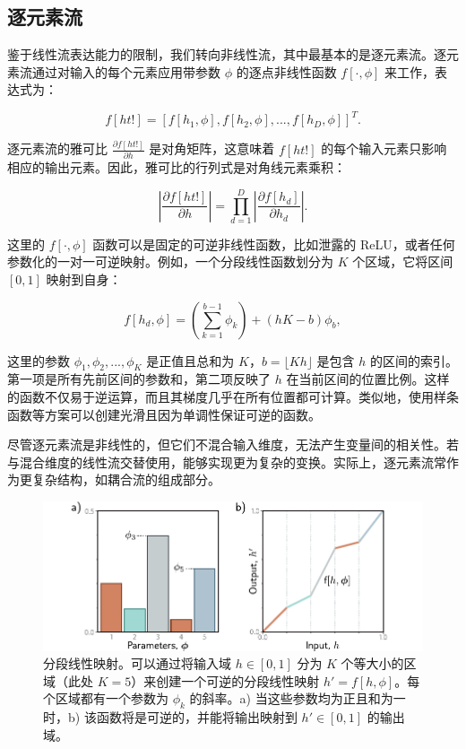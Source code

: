 \documentclass[lang=cn,newtx,10pt,scheme=chinese]{elegantbook}
\begin{document}
\subsection{逐元素流}
鉴于线性流表达能力的限制，我们转向非线性流，其中最基本的是逐元素流。逐元素流通过对输入的每个元素应用带参数 \(\phi\) 的逐点非线性函数 \(f[\cdot, \phi]\) 来工作，表达式为：

\begin{equation}
f[ht!] = [f[h_1, \phi], f[h_2, \phi], ..., f[h_D, \phi]]^T. 
\end{equation}

逐元素流的雅可比 \(\frac{\partial f[ht!]}{\partial h}\) 是对角矩阵，这意味着 \(f[ht!]\) 的每个输入元素只影响相应的输出元素。因此，雅可比的行列式是对角线元素乘积：

\begin{equation}
\left| \frac{\partial f[ht!]}{\partial h} \right| = \prod_{d=1}^D \left| \frac{\partial f[h_d]}{\partial h_d} \right|. 
\end{equation}

这里的 \(f[\cdot, \phi]\) 函数可以是固定的可逆非线性函数，比如泄露的 ReLU，或者任何参数化的一对一可逆映射。例如，一个分段线性函数划分为 \(K\) 个区域，它将区间 \([0, 1]\) 映射到自身：

\begin{equation}
f[h_d, \phi] = \left( \sum_{k=1}^{b-1} \phi_k \right) + (hK - b)\phi_b, 
\end{equation}

这里的参数 \(\phi_1, \phi_2, ..., \phi_K\) 是正值且总和为 \(K\)，\(b = \lfloor Kh \rfloor\) 是包含 \(h\) 的区间的索引。第一项是所有先前区间的参数和，第二项反映了 \(h\) 在当前区间的位置比例。这样的函数不仅易于逆运算，而且其梯度几乎在所有位置都可计算。类似地，使用样条函数等方案可以创建光滑且因为单调性保证可逆的函数。

尽管逐元素流是非线性的，但它们不混合输入维度，无法产生变量间的相关性。若与混合维度的线性流交替使用，能够实现更为复杂的变换。实际上，逐元素流常作为更复杂结构，如耦合流的组成部分。

\begin{figure}[ht!]
\centering
\includegraphics[width=0.7\linewidth]{PDFFigures/UDLChap16PDF/FlowPiecewiseLinear.pdf}
\caption{分段线性映射。可以通过将输入域 \( h \in [0, 1] \) 分为 \( K \) 个等大小的区域（此处 \( K = 5 \)）来创建一个可逆的分段线性映射 \( h' = f[h, \phi] \)。每个区域都有一个参数为 \( \phi_k \) 的斜率。a) 当这些参数均为正且和为一时，b) 该函数将是可逆的，并能将输出映射到 \( h' \in [0, 1] \) 的输出域。}
\end{figure}
\end{document}
